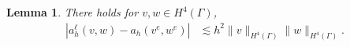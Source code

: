 \documentclass[10pt, a4paper]{amsart}
\newcommand{\p}{\partial}
\newcommand{\nab}{\nabla}
\newcommand{\bmu}{{\bm \mu}}
\newcommand{\calE}{\mathcal{E}}
\newcommand{\calF}{\mathcal{F}}
\newcommand{\calK}{\mathcal{K}}
\newtheorem{lemma}[theorem]{Lemma}
\theoremstyle{definition}
\theoremstyle{remark}
\theoremstyle{example}
\numberwithin{equation}{section}
\newcommand{\tbar}[1]{{\left\vert\kern-0.25ex\left\vert\kern-0.25ex\left\vert #1 
    \right\vert\kern-0.25ex\right\vert\kern-0.25ex\right\vert}}
\begin{document}

\begin{lemma}
There holds for $v, w \in H^4(\Gamma)$,
\begin{align}
|a_h^\ell(v, w) - a_h(v^e, w^e)|
& \lesssim h^2\|v\|_{H^4(\Gamma)}\|w\|_{H^4(\Gamma)}. \label{250902-4}
\end{align}
\end{lemma}
\end{document}
